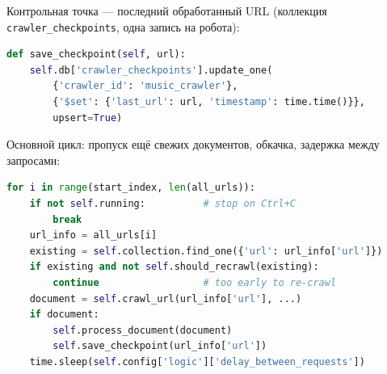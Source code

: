 Контрольная точка --- последний обработанный URL (коллекция
\texttt{crawler\_checkpoints}, одна запись на робота):

\begin{lstlisting}[language=Python]
def save_checkpoint(self, url):
    self.db['crawler_checkpoints'].update_one(
        {'crawler_id': 'music_crawler'},
        {'$set': {'last_url': url, 'timestamp': time.time()}},
        upsert=True)
\end{lstlisting}

Основной цикл: пропуск ещё свежих документов, обкачка, задержка между
запросами:

\begin{lstlisting}[language=Python]
for i in range(start_index, len(all_urls)):
    if not self.running:          # stop on Ctrl+C
        break
    url_info = all_urls[i]
    existing = self.collection.find_one({'url': url_info['url']})
    if existing and not self.should_recrawl(existing):
        continue                  # too early to re-crawl
    document = self.crawl_url(url_info['url'], ...)
    if document:
        self.process_document(document)
        self.save_checkpoint(url_info['url'])
    time.sleep(self.config['logic']['delay_between_requests'])
\end{lstlisting}

\pagebreak
